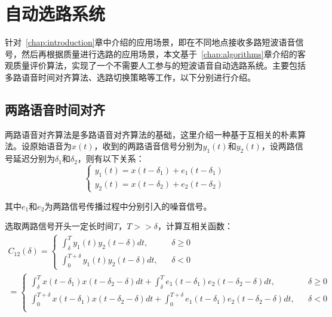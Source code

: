 \chapter{自动选路系统}
\label{chapter:switching}

针对~\ref{chap:introduction}章中介绍的应用场景，即在不同地点接收多路短波语音信号，然后再根据质量进行选路的应用场景，本文基于~\ref{chap:algorithms}章介绍的客观质量评价算法，实现了一个不需要人工参与的短波语音自动选路系统。主要包括多路语音时间对齐算法、选路切换策略等工作，以下分别进行介绍。

\section{两路语音时间对齐}\label{section:align2}

两路语音对齐算法是多路语音对齐算法的基础，这里介绍一种基于互相关的朴素算法。设原始语音为$x(t)$，收到的两路语音信号分别为$y_1(t)$和$y_2(t)$，设两路信号延迟分别为$\delta_1$和$\delta_2$，则有以下关系：
\begin{equation}
\left\{
    \begin{array}{l}
        y_1(t) = x(t-\delta_1) + e_1(t-\delta_1) \\
        y_2(t) = x(t-\delta_2) + e_2(t-\delta_2)
    \end{array}
\right.
\end{equation}

其中$e_1$和$e_2$为两路信号传播过程中分别引入的噪音信号。

选取两路信号开头一定长时间$T，T>>\delta$，计算互相关函数：
\begin{equation}\label{eq:corr}
\begin{array}{c}
    C_{12}(\delta)  = \left\{
    \begin{array}{rcl}
        \int_\delta^Ty_1(t)y_2(t-\delta)dt, && {\delta \geq 0} \\
        \int_0^{T+\delta}y_1(t)y_2(t-\delta)dt, && {\delta < 0}
    \end{array}
    \right. \\
    = \left\{
    \begin{array}{rcl}
        \int_\delta^Tx(t-\delta_1)x(t-\delta_2-\delta)dt+\int_\delta^Te_1(t-\delta_1)e_2(t-\delta_2-\delta)dt, && {\delta \geq 0} \\
        \int_0^{T+\delta}x(t-\delta_1)x(t-\delta_2-\delta)dt+\int_0^{T+\delta}e_1(t-\delta_1)e_2(t-\delta_2-\delta)dt, && {\delta < 0} \\
    \end{array}
    \right.
\end{array}
\end{equation}

